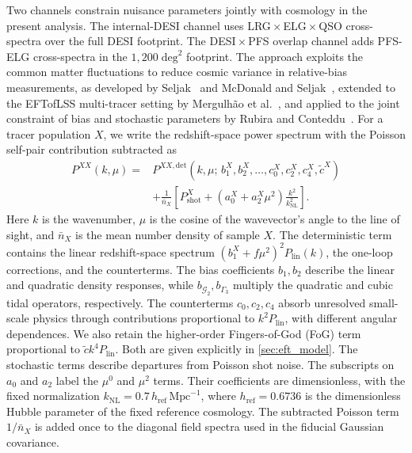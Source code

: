 \documentclass[a4paper,11pt]{article}
\newcommand{\revchange}[1]{{\color{RevisionColor}#1}}
\def\be{\begin{equation}}
\def\ee{\end{equation}}
\def\knl{k_{\mathrm{NL}}}
\newcommand{\G}{\mathcal{G}}
\newcommand{\ctilde}{\tilde{c}}
\newcommand{\Pshot}{P_{\mathrm{shot}}}
\newcommand{\nbar}{\bar{n}}
\begin{document}
\revchange{Two channels constrain nuisance parameters jointly with cosmology}
in the present analysis. The internal-DESI channel uses
LRG\,$\times$\,ELG\,$\times$\,QSO cross-spectra over the full DESI
footprint\revchange{. The DESI\,$\times$\,PFS} overlap channel adds PFS-ELG
cross-spectra in the $1{,}200\;\mathrm{deg}^2$ footprint\revchange{.
The approach exploits the common matter fluctuations to reduce cosmic
variance in relative-bias measurements, as} developed by
Seljak~\cite{Seljak:2008xr} and McDonald \revchange{and}
Seljak~\cite{McDonald:2008sh}, extended to the EFTofLSS
multi-tracer setting by Mergulh\~ao et al.~\cite{Mergulhao:2021kip,Mergulhao:2023zso},
and applied to the joint constraint of bias and stochastic parameters by
Rubira \revchange{and Conteddu~\cite{Rubira:2025scu}.}
\revchange{For a tracer population $X$, we write the redshift-space power spectrum with the
Poisson self-pair contribution subtracted as
\be
\label{eqn:auto}
\begin{aligned}
P^{XX}(k,\mu)
={}&P^{XX,\mathrm{det}}(k,\mu;\,b_1^X,b_2^X,\ldots,c_0^X,c_2^X,c_4^X,\ctilde^X)\\
&+\frac{1}{\nbar_X}\left[\Pshot^X+
  \left(a_0^X+a_2^X\mu^2\right)\frac{k^2}{\knl^2}\right].
\end{aligned}
\ee
Here $k$ is the wavenumber, $\mu$ is the cosine of the wavevector's
angle to the line of sight, and $\nbar_X$ is the mean number density
of sample $X$.
The deterministic term contains the linear redshift-space spectrum
$(b_1^X+f\mu^2)^2P_{\mathrm{lin}}(k)$, the one-loop corrections, and
the counterterms. The bias coefficients $b_1,b_2$ describe the linear
and quadratic density responses, while $b_{\G_2},b_{\Gamma_3}$
multiply the quadratic and cubic tidal operators, respectively.
The counterterms $c_0,c_2,c_4$ absorb unresolved small-scale physics
through contributions proportional to $k^2P_{\mathrm{lin}}$, with different
angular dependences. We also retain the higher-order Fingers-of-God (FoG) term
proportional to $\ctilde k^4P_{\mathrm{lin}}$. Both are given explicitly in \cref{sec:eft_model}.
The stochastic terms describe departures from Poisson shot noise.
The subscripts on $a_0$ and $a_2$ label the $\mu^0$ and $\mu^2$ terms.
Their coefficients are dimensionless, with the fixed normalization
$\knl=0.7\,h_{\mathrm{ref}}\,\mathrm{Mpc}^{-1}$, where $h_{\mathrm{ref}}=0.6736$
is the dimensionless Hubble parameter of the fixed reference cosmology.
The subtracted Poisson term $1/\nbar_X$ is added once to the
diagonal field spectra used in the fiducial Gaussian covariance.}
\end{document}
